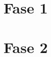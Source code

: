 







\tableofcontents
\newpage


\section{Fase 1}
	\label{Ejercicio-1}
	
		
\section{Fase 2}
	\label{Ejercicio-2}
	
	

